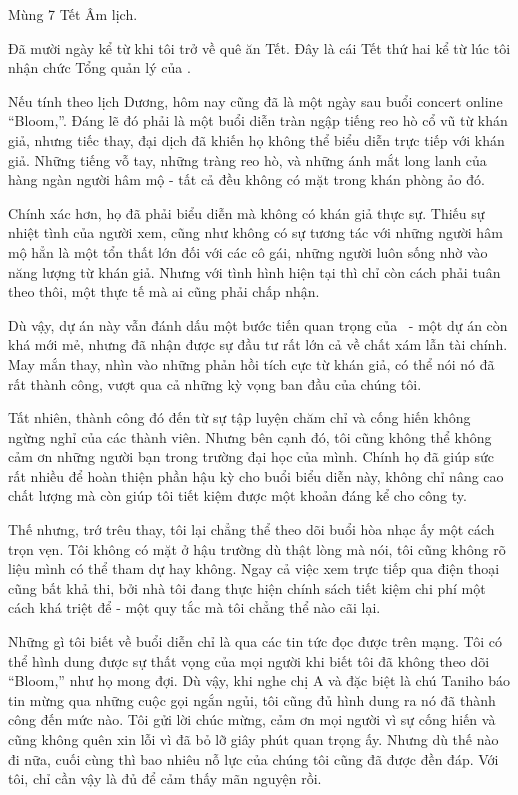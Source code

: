 \documentclass[../main.tex]{subfiles}
\begin{document}

Mùng 7 Tết Âm lịch.

Đã mười ngày kể từ khi tôi trở về quê ăn Tết. Đây là cái Tết thứ hai kể từ lúc tôi nhận chức Tổng quản lý của \hll.

Nếu tính theo lịch Dương, hôm nay cũng đã là một ngày sau buổi concert online ``Bloom,''. Đáng lẽ đó phải là một buổi diễn tràn ngập tiếng reo hò cổ vũ từ khán giả, nhưng tiếc thay, đại dịch đã khiến họ không thể biểu diễn trực tiếp với khán giả. Những tiếng vỗ tay, những tràng reo hò, và những ánh mắt long lanh của hàng ngàn người hâm mộ - tất cả đều không có mặt trong khán phòng ảo đó.

Chính xác hơn, họ đã phải biểu diễn mà không có khán giả thực sự. Thiếu sự nhiệt tình của người xem, cũng như không có sự tương tác với những người hâm mộ hẳn là một tổn thất lớn đối với các cô gái, những người luôn sống nhờ vào năng lượng từ khán giả. Nhưng với tình hình hiện tại thì chỉ còn cách phải tuân theo thôi, một thực tế mà ai cũng phải chấp nhận.

Dù vậy, dự án này vẫn đánh dấu một bước tiến quan trọng của \hll\ - một dự án còn khá mới mẻ, nhưng đã nhận được sự đầu tư rất lớn cả về chất xám lẫn tài chính. May mắn thay, nhìn vào những phản hồi tích cực từ khán giả, có thể nói nó đã rất thành công, vượt qua cả những kỳ vọng ban đầu của chúng tôi.

Tất nhiên, thành công đó đến từ sự tập luyện chăm chỉ và cống hiến không ngừng nghỉ của các thành viên. Nhưng bên cạnh đó, tôi cũng không thể không cảm ơn những người bạn trong trường đại học của mình. Chính họ đã giúp sức rất nhiều để hoàn thiện phần hậu kỳ cho buổi biểu diễn này, không chỉ nâng cao chất lượng mà còn giúp tôi tiết kiệm được một khoản đáng kể cho công ty.

Thế nhưng, trớ trêu thay, tôi lại chẳng thể theo dõi buổi hòa nhạc ấy một cách trọn vẹn. Tôi không có mặt ở hậu trường dù thật lòng mà nói, tôi cũng không rõ liệu mình có thể tham dự hay không. Ngay cả việc xem trực tiếp qua điện thoại cũng bất khả thi, bởi nhà tôi đang thực hiện chính sách tiết kiệm chi phí một cách khá triệt để - một quy tắc mà tôi chẳng thể nào cãi lại.

Những gì tôi biết về buổi diễn chỉ là qua các tin tức đọc được trên mạng. Tôi có thể hình dung được sự thất vọng của mọi người khi biết tôi đã không theo dõi ``Bloom,'' như họ mong đợi. Dù vậy, khi nghe chị A và đặc biệt là chú Taniho báo tin mừng qua những cuộc gọi ngắn ngủi, tôi cũng đủ hình dung ra nó đã thành công đến mức nào. Tôi gửi lời chúc mừng, cảm ơn mọi người vì sự cống hiến và cũng không quên xin lỗi vì đã bỏ lỡ giây phút quan trọng ấy. Nhưng dù thế nào đi nữa, cuối cùng thì bao nhiêu nỗ lực của chúng tôi cũng đã được đền đáp. Với tôi, chỉ cần vậy là đủ để cảm thấy mãn nguyện rồi.
\end{document}

